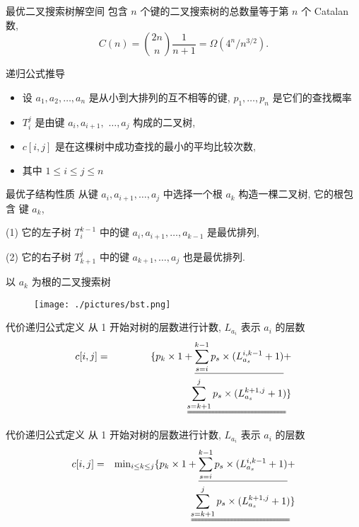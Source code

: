 \documentclass[fontset=fandol,UTF8,fleqn]{beamer}
\begin{document}
\begin{frame}{最优二叉搜索树解空间}
包含 $n$ 个键的二叉搜索树的总数量等于第 $n$ 个 Catalan 数,
\begin{displaymath}
  C(n)={2n \choose n}\frac{1}{n+1} = \Omega(4^n/n^{3/2}).
\end{displaymath}
\end{frame}

\begin{frame}{递归公式推导}
\begin{itemize}
\item 设 $a_1, a_2, \ldots, a_n$ 是从小到大排列的互不相等的键, $p_1, \ldots, p_n$ 是它们的查找概率
\item $T_i^j$ 是由键 $a_i, a_{i+1},$ $\ldots, a_j$ 构成的二叉树,  
\item $c[i,j]$ 是在这棵树中成功查找的最小的平均比较次数,  
\item 其中 $1\leq i \leq j \leq   n$ 
\end{itemize}
\end{frame}

\begin{frame}{最优子结构性质}
 从键 $a_i, a_{i+1}, \ldots, a_j$ 中选择一个根 $a_k$ 构造一棵二叉树, 它的根包含
 键 $a_k$, 

(1) 它的左子树 $T_i^{k-1}$ 中的键 $a_i, a_{i+1}, \ldots, a_{k-1}$ 是最优排列,

(2) 它的右子树 $T_{k+1}^j$ 中的键 $a_{k+1}, \ldots, a_j$ 也是最优排列.
\end{frame}

\begin{frame}{ 以 $a_k$ 为根的二叉搜索树}
\begin{figure}
  \centering
  \texttt{[image: ./pictures/bst.png]}%
\end{figure}
\end{frame}

\begin{frame}{代价递归公式定义}
从 1 开始对树的层数进行计数, $L_{a_i}$ 表示 $a_i$ 的层数 
\begin{eqnarray*}
  c[i,j] & = &\qquad\quad\  \{p_k\times 1+\underline{\sum_{s=i}^{k-1}p_s\times (L^{i,k-1}_{a_s}+1)}+\\
& & \uuline{\sum_{s=k+1}^jp_s\times(L^{k+1,j}_{a_s}+1)}\}   \\
\end{eqnarray*}
\end{frame}

\begin{frame}{代价递归公式定义}
从 1 开始对树的层数进行计数, $L_{a_i}$ 表示 $a_i$ 的层数 
\begin{eqnarray*}
  c[i,j] & = & \mathrm{min}_{i\leq k\leq j}\{p_k\times 1+\underline{\sum_{s=i}^{k-1}p_s\times (L^{i,k-1}_{a_s}+1)}+\\
& & \uuline{\sum_{s=k+1}^jp_s\times(L^{k+1,j}_{a_s}+1)}\}   \\
\end{eqnarray*}
\end{frame}
\end{document}
